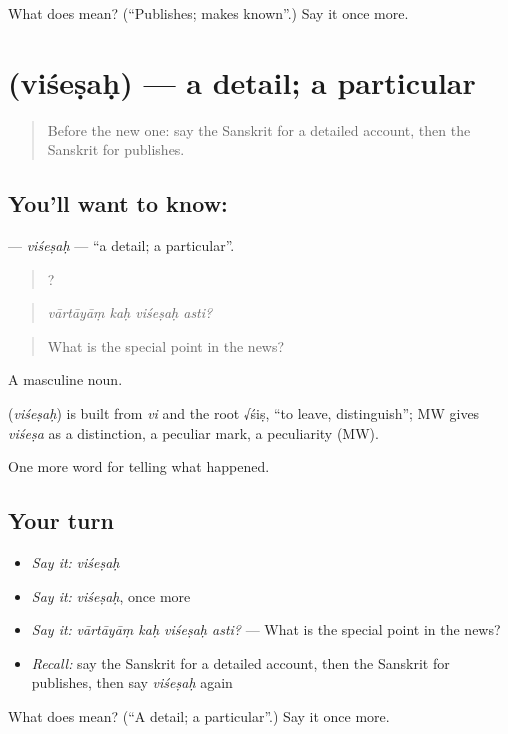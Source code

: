 \begin{tcolorbox}[breakable,colback=teal!4,colframe=teal!35!black,title={Before you move on}]
What does  mean? (\textquotedblleft{}Publishes; makes known\textquotedblright{}.) Say it once more.
\end{tcolorbox}
\section[\texorpdfstring{\sk{विशेषः} (viśeṣaḥ)}{विशेषः (viśeṣaḥ)}]{ (viśeṣaḥ) — a detail; a particular}

\label{lesson:SA-C310-visesah}



\begin{quote}
Before the new one: say the Sanskrit for a detailed account, then the Sanskrit for publishes.
\end{quote}

\subsection*{You'll want to know: }
\textbf{} — \emph{viśeṣaḥ} — \textquotedblleft{}a detail; a particular\textquotedblright{}.

\begin{quote}
   ?
\end{quote}

\begin{quote}
\emph{vārtāyāṃ kaḥ viśeṣaḥ asti?}
\end{quote}

\begin{quote}
What is the special point in the news?
\end{quote}

A masculine noun.

\begin{cousinweb}
\textbf{} (\emph{viśeṣaḥ}) is built from \emph{vi} and the root √śiṣ, \textquotedblleft{}to leave, distinguish\textquotedblright{}; MW gives \emph{viśeṣa} as a distinction, a peculiar mark, a peculiarity (MW).
\end{cousinweb}

\begin{grammarlens}[title={What you've built}]
One more word for telling what happened.
\end{grammarlens}

\subsection*{Your turn}
\begin{itemize}
\raggedright
  \item \emph{Say it:} \emph{viśeṣaḥ}
  \item \emph{Say it:} \emph{viśeṣaḥ}, once more
  \item \emph{Say it:} \emph{vārtāyāṃ kaḥ viśeṣaḥ asti?} — What is the special point in the news?
  \item \emph{Recall:} say the Sanskrit for a detailed account, then the Sanskrit for publishes, then say \emph{viśeṣaḥ} again
\end{itemize}

\begin{tcolorbox}[breakable,colback=teal!4,colframe=teal!35!black,title={Before you move on}]
What does  mean? (\textquotedblleft{}A detail; a particular\textquotedblright{}.) Say it once more.
\end{tcolorbox}
